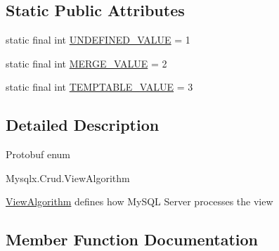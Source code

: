 \subsection*{Static Public Attributes}
\begin{DoxyCompactItemize}
\item 
static final int \mbox{\hyperlink{enumcom_1_1mysql_1_1cj_1_1x_1_1protobuf_1_1_mysqlx_crud_1_1_view_algorithm_ae9e60d6bb88e5019b546bd50fc6d0c42}{U\+N\+D\+E\+F\+I\+N\+E\+D\+\_\+\+V\+A\+L\+UE}} = 1
\item 
static final int \mbox{\hyperlink{enumcom_1_1mysql_1_1cj_1_1x_1_1protobuf_1_1_mysqlx_crud_1_1_view_algorithm_a469266dcd286b0b669be166e8557dc7d}{M\+E\+R\+G\+E\+\_\+\+V\+A\+L\+UE}} = 2
\item 
static final int \mbox{\hyperlink{enumcom_1_1mysql_1_1cj_1_1x_1_1protobuf_1_1_mysqlx_crud_1_1_view_algorithm_a3193f985b14e58d9944fd3338a5bc991}{T\+E\+M\+P\+T\+A\+B\+L\+E\+\_\+\+V\+A\+L\+UE}} = 3
\end{DoxyCompactItemize}


\subsection{Detailed Description}
Protobuf enum
\begin{DoxyCode}
Mysqlx.Crud.ViewAlgorithm 
\end{DoxyCode}



\begin{DoxyPre}
\mbox{\hyperlink{enumcom_1_1mysql_1_1cj_1_1x_1_1protobuf_1_1_mysqlx_crud_1_1_view_algorithm}{ViewAlgorithm}} defines how MySQL Server processes the view
\end{DoxyPre}
 

\subsection{Member Function Documentation}
\mbox{\label{enumcom_1_1mysql_1_1cj_1_1x_1_1protobuf_1_1_mysqlx_crud_1_1_view_algorithm_ac9a20c67de035b5d3c8169080c5115ea}} 
